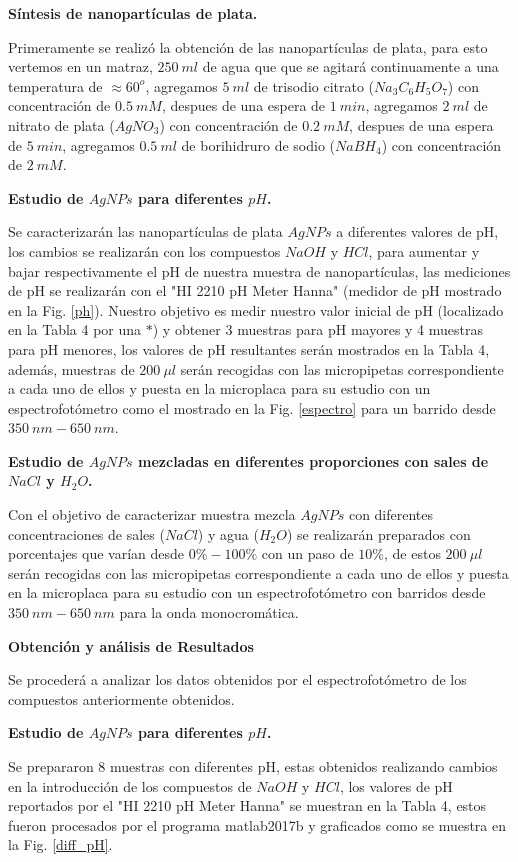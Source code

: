 \textbf{Síntesis de nanopartículas de plata.}

Primeramente se realizó la obtención de las nanopartículas de plata, para esto vertemos en un matraz, $250~ml$ de agua que que se agitará continuamente a una temperatura de $\approx 60^o$, agregamos $5~ml$ de trisodio citrato ($Na_3C_6H_5O_7$) con concentración de $0.5~mM$, despues de una espera de $1~min$, agregamos $2~ml$ de nitrato de plata ($AgNO_3$) con concentración de $0.2~mM$, despues de una espera de $5~min$, agregamos $0.5~ml$ de borihidruro de sodio ($NaBH_4$) con concentración de $2~mM$.

\textbf{Estudio de $AgNPs$ para diferentes $pH$.}

Se caracterizarán las nanopartículas de plata $AgNPs$ a diferentes valores de pH, los cambios se realizarán con los compuestos  $NaOH$ y $HCl$, para aumentar y bajar respectivamente el pH de nuestra muestra de nanopartículas, las mediciones de pH se realizarán con el "HI 2210 pH Meter Hanna" (medidor de pH mostrado en la Fig. \ref{ph}). Nuestro objetivo es medir nuestro valor inicial de pH (localizado en la Tabla 4 por una $*$) y obtener 3 muestras para pH mayores y 4 muestras para pH menores, los valores de pH resultantes serán mostrados en la Tabla 4, además, muestras de $200~\mu l$ serán recogidas con las micropipetas correspondiente a cada uno de ellos y puesta en la microplaca para su estudio con un espectrofotómetro como el mostrado en la Fig. \ref{espectro} para un barrido desde $350~nm-650~nm$.

\textbf{Estudio de $AgNPs$ mezcladas en diferentes proporciones con sales de $NaCl$ y $H_2O$.}

Con el objetivo de caracterizar muestra mezcla $AgNPs$ con diferentes concentraciones de sales ($NaCl$) y agua ($H_2O$) se realizarán preparados con porcentajes que varían desde $0\%-100\%$ con un paso de $10\%$, de estos $200~\mu l$ serán recogidas con las micropipetas correspondiente a cada uno de ellos y puesta en la microplaca para su estudio con un espectrofotómetro con barridos desde $350~nm-650~nm$ para la onda monocromática.

\textbf{\textcolor{azul50}{Obtención y análisis de Resultados}}

Se procederá a analizar los datos obtenidos por el espectrofotómetro de los compuestos anteriormente obtenidos.

\textbf{Estudio de $AgNPs$ para diferentes $pH$.}

Se prepararon 8 muestras con diferentes pH, estas obtenidos realizando cambios en la introducción de los compuestos de $NaOH$ y $HCl$, los valores de pH reportados por el "HI 2210 pH Meter Hanna" se muestran en la Tabla 4, estos fueron procesados por el programa matlab2017b y graficados como se muestra en la Fig. \ref{diff_pH}.

